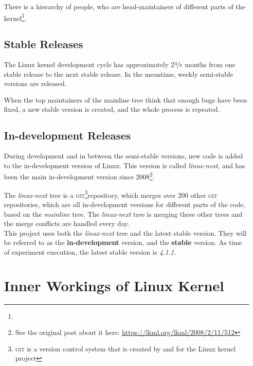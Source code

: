 \documentclass[a4paper,11pt]{report}
\newcommand{\f}{\footnote{\fn}}
\begin{document}
There is a hierarchy of people, who are head-maintainers of different parts of 
the kernel\f.


            \subsection*{Stable Releases}

The Linux kernel development cycle has approximately 2$\sfrac{3}{4}$ months 
from one stable release to the next stable release\cite
    {crystalball}.
In the meantime, weekly semi-stable versions are released.

When the top maintainers of the mainline tree think that enough bugs have been 
fixed, a new stable version is created, and the whole process is repeated.


            \subsection*{In-development Releases}

            \def \fn {See the original post about it here: 
            \url{https://lkml.org/lkml/2008/2/11/512}}

During development and in between the semi-stable versions, new code is added to the in-development version of Linux.
This version is called \emph{linux-next}, and has been the main in-development version
since 2008\f.
\\

            \def \fn {\textsc{git} is a version control system that is created
            by and for the Linux kernel project}

The \emph{linux-next} tree is a \textsc{git}\f repository, which merges over 200 
other \textsc{git} repositories\cite {nextTrees}, which are all in-development versions for different parts of the code, based on the 
\emph{mainline} tree. The \emph{linux-next} tree is merging these other trees 
and the merge conflicts are handled every day.
\\

This project uses both the \emph{linux-next} tree and the latest stable 
version. They will be referred to as the \textbf{in-development} 
version, and the \textbf{stable} version. As time of experiment execution, the 
latest stable version is \emph{4.1.1}.


    \section{Inner Workings of Linux Kernel}
\end{document}
